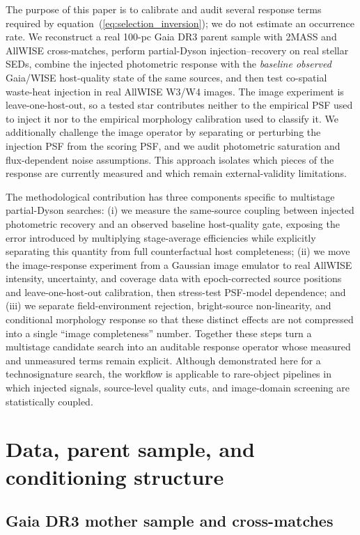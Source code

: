 \documentclass[fleqn,usenatbib]{mnras}
\begin{document}
The purpose of this paper is to calibrate and audit several response terms required by equation~(\ref{eq:selection_inversion}); we do not estimate an occurrence rate. We reconstruct a real 100-pc Gaia DR3 parent sample with 2MASS and AllWISE cross-matches, perform partial-Dyson injection--recovery on real stellar SEDs, combine the injected photometric response with the \emph{baseline observed} Gaia/WISE host-quality state of the same sources, and then test co-spatial waste-heat injection in real AllWISE W3/W4 images. The image experiment is leave-one-host-out, so a tested star contributes neither to the empirical PSF used to inject it nor to the empirical morphology calibration used to classify it. We additionally challenge the image operator by separating or perturbing the injection PSF from the scoring PSF, and we audit photometric saturation and flux-dependent noise assumptions. This approach isolates which pieces of the response are currently measured and which remain external-validity limitations.

The methodological contribution has three components specific to multistage partial-Dyson searches: (i) we measure the same-source coupling between injected photometric recovery and an observed baseline host-quality gate, exposing the error introduced by multiplying stage-average efficiencies while explicitly separating this quantity from full counterfactual host completeness; (ii) we move the image-response experiment from a Gaussian image emulator to real AllWISE intensity, uncertainty, and coverage data with epoch-corrected source positions and leave-one-host-out calibration, then stress-test PSF-model dependence; and (iii) we separate field-environment rejection, bright-source non-linearity, and conditional morphology response so that these distinct effects are not compressed into a single ``image completeness'' number. Together these steps turn a multistage candidate search into an auditable response operator whose measured and unmeasured terms remain explicit. Although demonstrated here for a technosignature search, the workflow is applicable to rare-object pipelines in which injected signals, source-level quality cuts, and image-domain screening are statistically coupled.

\section{Data, parent sample, and conditioning structure}
\label{sec:data}

\subsection{Gaia DR3 mother sample and cross-matches}
\end{document}
